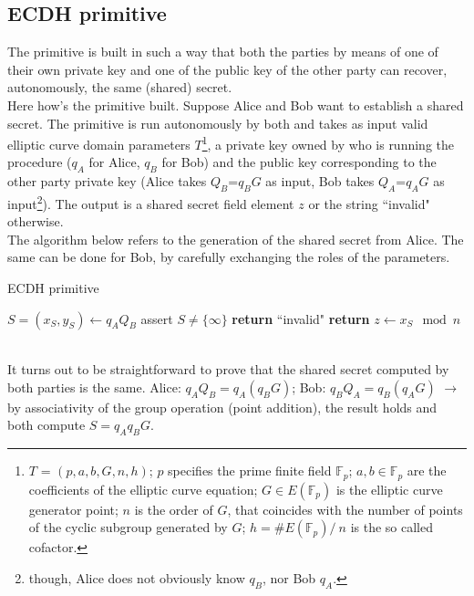 \subsection{ECDH primitive}
The primitive is built in such a way that both the parties by means of one of their own private key and one of the public key of the other party can recover, autonomously, the same (shared) secret.\\
Here how's the primitive built. Suppose Alice and Bob want to establish a shared secret. The primitive is run autonomously by both and takes as input valid elliptic curve domain parameters $T$\footnote{$T$ = $(p, a, b, G, n, h)$; $p$ specifies the prime finite field $\mathbb{F}_p$; $a,b \in \mathbb{F}_p$ are the coefficients of the elliptic curve equation; $G \in E(\mathbb{F}_p)$ is the elliptic curve generator point; $n$ is the order of $G$, that coincides with the number of points of the cyclic subgroup generated by $G$; $h = \#E(\mathbb{F}_p)/\ n$ is the so called cofactor.}, a private key owned by who is running the procedure ($q_A$ for Alice, $q_B$ for Bob) and the public key corresponding to the other party private key (Alice takes $Q_B$=$q_BG$ as input, Bob takes $Q_A$=$q_AG$ as input\footnote{though, Alice does not obviously know $q_B$, nor Bob $q_A$.}). The output is a shared secret field element $z$ or the string ``invalid" otherwise.\\
The algorithm below refers to the generation of the shared secret from Alice. The same can be done for Bob, by carefully exchanging the roles of the parameters.
\begin{algorithm}
	\caption{ECDH primitive}
	\label{alg:ECDH}
	\begin{algorithmic}[1]
		\State $S = (x_S,y_S) \gets q_AQ_B$
		\State assert $S \neq \{\infty\}$
		\State \textbf{return} ``invalid"
		\EndIf 
		\State \textbf{return} $z \gets x_S \mod{n}$ 
		\EndProcedure
	\end{algorithmic}
\end{algorithm}\\
It turns out to be straightforward to prove that the shared secret computed by both parties is the same. Alice: $q_AQ_B = q_A(q_BG)$; Bob: $q_BQ_A = q_B(q_AG)$ $\rightarrow$ by associativity of the group operation (point addition), the result holds and both compute $S=q_Aq_BG$.
